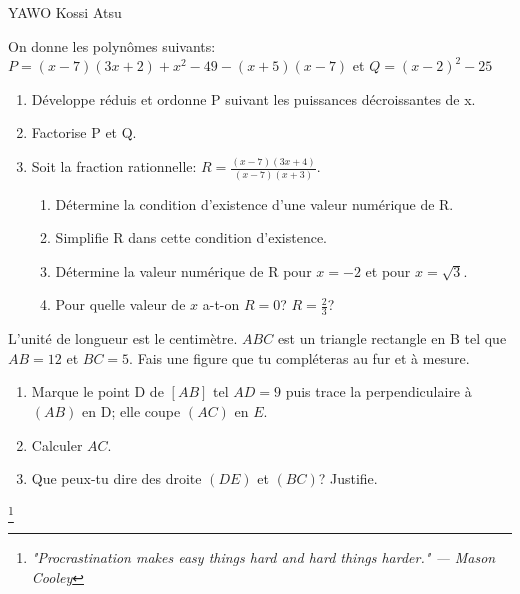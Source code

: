 \documentclass[12pt,a4paper]{book}
\newcommand{\prof}{YAWO Kossi Atsu}
\begin{document}
\begin{revision}{\prof}
\vspace{0.3cm}

\begin{exo}
On donne les polynômes suivants: $P=(x-7)(3x+2)+x^2-49-(x+5)(x-7)$ et $Q=(x-2)^2-25$
\begin{enumerate}
\item Développe réduis et ordonne P suivant les puissances décroissantes de x.
\item Factorise P et Q.
\item Soit la fraction rationnelle: $R=\frac{(x-7)(3x+4)}{(x-7)(x+3)}$.
\begin{enumerate}
\item Détermine la condition d'existence d'une valeur numérique de R.
\item Simplifie R dans cette condition d'existence.
\item Détermine la valeur numérique de R pour $x=-2$ et pour $x=\sqrt{3}$.
\item Pour quelle valeur de $x$ a-t-on $R=0$? $R=\frac{2}{3}$?
\end{enumerate}
\end{enumerate}
\end{exo}

\vspace{0.3cm}

\begin{exo}
L'unité de longueur est le centimètre. $ABC$ est un triangle rectangle en B tel que $AB=12$ et $BC=5$. Fais une figure que tu compléteras au fur et à mesure.
\begin{enumerate}
\item  Marque le point D de $[AB]$ tel $AD=9$ puis trace la perpendiculaire à $(AB)$ en D; elle coupe $(AC)$ en $E$.
\item Calculer $AC$.
\item Que peux-tu dire des droite $(DE)$ et $(BC)$? Justifie.
\end{enumerate}
\end{exo}
\footnote{\textit{"Procrastination makes easy things hard and hard things harder." — Mason Cooley}}

\vspace{0.3cm}


\end{revision}
\end{document}
